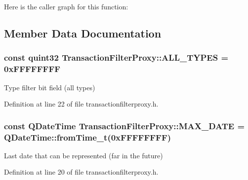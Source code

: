 Here is the caller graph for this function\+:




\subsection{Member Data Documentation}
\hypertarget{class_transaction_filter_proxy_a845c1358f6cc8e60b6fae4725d2fc03f}{}
\subsubsection[{A\+L\+L\+\_\+\+T\+Y\+P\+E\+S}]{\setlength{\rightskip}{0pt plus 5cm}const quint32 Transaction\+Filter\+Proxy\+::\+A\+L\+L\+\_\+\+T\+Y\+P\+E\+S = 0x\+F\+F\+F\+F\+F\+F\+F\+F\hspace{0.3cm}{\ttfamily [static]}}\label{class_transaction_filter_proxy_a845c1358f6cc8e60b6fae4725d2fc03f}
Type filter bit field (all types) 

Definition at line 22 of file transactionfilterproxy.\+h.

\hypertarget{class_transaction_filter_proxy_a5ac7f4d41a56e44f4cc74ebeffb5a254}{}
\subsubsection[{M\+A\+X\+\_\+\+D\+A\+T\+E}]{\setlength{\rightskip}{0pt plus 5cm}const Q\+Date\+Time Transaction\+Filter\+Proxy\+::\+M\+A\+X\+\_\+\+D\+A\+T\+E = Q\+Date\+Time\+::from\+Time\+\_\+t(0x\+F\+F\+F\+F\+F\+F\+F\+F)\hspace{0.3cm}{\ttfamily [static]}}\label{class_transaction_filter_proxy_a5ac7f4d41a56e44f4cc74ebeffb5a254}
Last date that can be represented (far in the future) 

Definition at line 20 of file transactionfilterproxy.\+h.

\hypertarget{class_transaction_filter_proxy_aac7bf4c1105641b19eb6f7c8741b502e}{}
